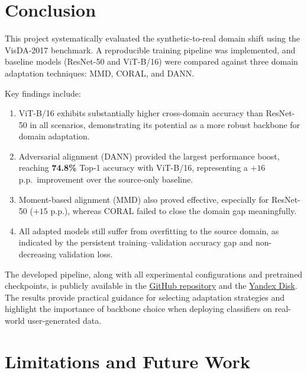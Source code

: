 \documentclass[a4paper,12pt]{extarticle}
\begin{document}
\section{Conclusion}
\label{sec:conclusion}

This project systematically evaluated the synthetic-to-real domain shift using the VisDA-2017 benchmark. A reproducible
training pipeline was implemented, and baseline models (ResNet-50 and ViT-B/16) were compared against three domain
adaptation techniques: MMD, CORAL, and DANN.

Key findings include:
\begin{enumerate}
	\item ViT-B/16 exhibits substantially higher cross-domain accuracy than ResNet-50 in all scenarios, demonstrating its
	      potential as a more robust backbone for domain adaptation.
	\item Adversarial alignment (DANN) provided the largest performance boost, reaching \textbf{74.8\%} Top-1 accuracy with
	      ViT-B/16, representing a $+16$ p.p.\ improvement over the source-only baseline.
	\item Moment-based alignment (MMD) also proved effective, especially for ResNet-50 ($+15$ p.p.), whereas CORAL failed to
	      close the domain gap meaningfully.
	\item All adapted models still suffer from overfitting to the source domain, as indicated by the persistent
	      training--validation accuracy gap and non-decreasing validation loss.
\end{enumerate}

The developed pipeline, along with all experimental configurations and pretrained checkpoints, is publicly available in
the \href{https://github.com/DenisIndenbom/computer_vision_laboratory}{GitHub repository} and the
\href{https://disk.360.yandex.ru/d/IaW1rYoeL61T0w}{Yandex Disk}. The results provide practical guidance for selecting
adaptation strategies and highlight the importance of backbone choice when deploying classifiers on real-world
user-generated data.

\section{Limitations and Future Work}
\label{sec:future}
\end{document}
